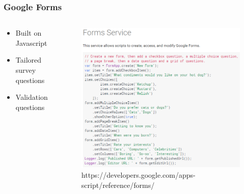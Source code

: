 \begin{frame}
	\frametitle{Google Forms}
	\begin{columns}
		\begin{column}{0.4\textwidth}
			\begin{itemize}
				\item Built on Javascript
				\item Tailored survey questions
				\item Validation questions
			\end{itemize}
		\end{column}
		\begin{column}{0.6\textwidth}
			\begin{figure}
				\centering
				\includegraphics[scale=0.35]{figures/GoogleScript.png}
				\caption{https://developers.google.com/apps-script/reference/forms/}
			\end{figure}
		\end{column}
	\end{columns}
\end{frame}